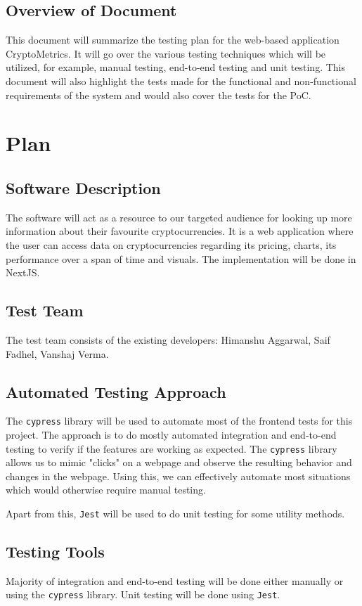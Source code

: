 \documentclass[12pt, titlepage]{article}
\begin{document}
\newpage
\subsection{Overview of Document}
This document will summarize the testing plan for the web-based application CryptoMetrics. It will go over the various testing techniques which will be utilized, for example, manual testing, end-to-end testing and unit testing. This document will also highlight the tests made for the functional and non-functional requirements of the system and would also cover the tests for the PoC. 

\section{Plan}
	
\subsection{Software Description}
The software will act as a resource to our targeted audience for looking up more information about their favourite cryptocurrencies. It is a web application where the user can access data on cryptocurrencies regarding its pricing, charts, its performance over a span of time and visuals. The implementation will be done in NextJS. 

\subsection{Test Team}
The test team consists of the existing developers: Himanshu Aggarwal, Saif Fadhel, Vanshaj Verma.

\subsection{Automated Testing Approach}
The \texttt{cypress} library will be used to automate most of the frontend tests for this project. The approach is to do mostly automated integration and end-to-end testing to verify if the features are working as expected. The \texttt{cypress} library allows us to mimic "clicks" on a webpage and observe the resulting behavior and changes in the webpage. Using this, we can effectively automate most situations which would otherwise require manual testing.

Apart from this, \texttt{Jest} will be used to do unit testing for some utility methods.

\subsection{Testing Tools}
Majority of integration and end-to-end testing will be done either manually or using the \texttt{cypress} library. Unit testing will be done using \texttt{Jest}.
\end{document}
